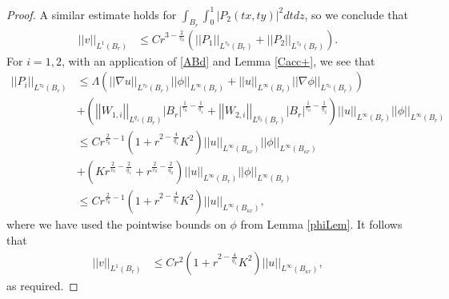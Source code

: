\documentclass[12pt,reqno]{amsart}
\theoremstyle{plain}
\theoremstyle{definition}
\newcommand{\disp}{\displaystyle}
\newcommand{\be}{\beta}
\newcommand{\La}{\Lambda}
\newcommand{\iny}{\infty}
\newcommand{\gr}{\nabla}
\newcommand{\norm}[1]{\left\vert \left\vert #1\right\vert\right\vert}
\newcommand{\abs}[1]{\left\vert#1\right\vert}
\newcommand{\pr}[1]{\left( #1 \right) }
\begin{document}
\begin{proof}
A similar estimate holds for $\disp \int_{B_r} \int_0^1 \abs{P_2\pr{tx,ty}}^2 dt dz$, so we conclude that
\begin{align*}
\norm{v}_{L^1\pr{B_r}}
&\le C r^{3 - \frac 2 {\tau_0}} \pr{ \norm{P_1}_{L^{\tau_0}\pr{B_r}} + \norm{P_2}_{L^{\tau_0}\pr{B_r}}}.
\end{align*}
For $i = 1, 2$, with an application of \eqref{ABd} and Lemma \ref{Cacc+}, we see that
\begin{align*}
\norm{P_i}_{L^{\tau_0}\pr{B_r}} 
&\le \La \pr{\norm{\gr u}_{L^{\tau_0}\pr{B_r}} \norm{\phi}_{L^\iny\pr{B_r}} + \norm{u}_{L^\iny\pr{B_r}} \norm{\gr\phi}_{L^{\tau_0}\pr{B_r}}} \\
&+\pr{ \norm{W_{1,i}}_{L^{q_1}\pr{B_r}} \abs{B_r}^{\frac 1 {\tau_0} -\frac{1}{q_1}} + \norm{W_{2,i}}_{L^{q_2}\pr{B_r}} \abs{B_r}^{\frac 1 {\tau_0} -\frac{1}{q_2}}} \norm{u}_{L^\iny\pr{B_r}} \norm{\phi}_{L^\iny\pr{B_r}} \\
&\le C r^{\frac 2 {\tau_0} -1}  \pr{1 + r^{2 - \frac {4}{q_1} }K^2 } \norm{u}_{L^\iny\pr{B_{\kappa r}}}  \norm{\phi}_{L^{\iny}\pr{B_{\kappa r}}} \\
&+ \pr{K r^{\frac 2 {\tau_0} -\frac{2}{q_1}} +  r^{\frac 2 {\tau_0} -\frac{2}{q_2}}} \norm{u}_{L^\iny\pr{B_r}} \norm{\phi}_{L^\iny\pr{B_r}} \\
&\le C r^{\frac 2 {\tau_0} -1} \pr{1 + r^{2 - \frac {4}{q_1} }K^2 } \norm{u}_{L^\iny\pr{B_{\kappa r}}},
\end{align*}
where we have used the pointwise bounds on $\phi$ from Lemma \ref{phiLem}.
It follows that
\begin{align*}
\norm{v}_{L^1\pr{B_r}}
&\le C r^2  \pr{1 + r^{2 - \frac {4}{q_1} }K^2 }   \norm{u}_{L^\iny\pr{B_{\kappa r}}},
\end{align*}
as required.
\end{proof}
\end{document}
